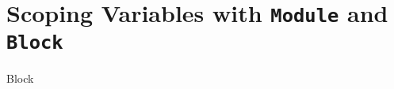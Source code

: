 \section{Scoping Variables with \texttt{Module} and \texttt{Block}}

\begin{code}

	   Block
\end{code}
